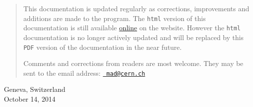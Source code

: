 \begin{titlepage}
\begin{quotation}
This documentation is updated regularly as corrections, improvements
and additions are made to the program. 
The {\tt html} version of this documentation is still
available \href{http://cern.ch/madx/madX/doc/usrguide/uguide.html}{online}
on the \href{http://cern.ch/madx}{\madx} website. However the {\tt html}
documentation is no longer actively updated and  will be replaced
by this {\tt PDF} version of the documentation in the near future. 

Comments and corrections from readers are most welcome. They may be sent to the
email address: \href{mailto:mad@cern.ch?subject=[user's guide]}{\tt 
mad@cern.ch}
\end{quotation}
\vfill

\begin{center}
Geneva, Switzerland \\
October 14, 2014 
\end{center}

\end{titlepage}



